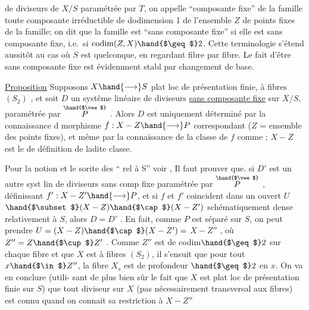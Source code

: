 
de diviseurs de $X/S$ paramétrée par $T$, on appelle ``composante fixe'' de la
famille toute composante irréductible de dodimension 1 de l'ensemble $Z$ de
points fixes de la famille; on dit que la famille est ``sans composante
fixe'' si elle est sans composante fixe, i.e.\ si $\operatorname{codim}(Z,X) \hand{$\geq$} 2$. Cette
terminologie s'étend aussitôt au cas où $S$ est quelconque, en regardant
fibre par fibre. Le fait d'être sans composante fixe est évidemment stabl
par changement de base.

\uline{Proposition} \hand{/}Supposons $X \hand{\longrightarrow} S$ plat loc de présentation finie, à fibres
$(S_2)$ , et soit $D$ un systême linéaire de diviseurs \uline{sans composante fixe}
sur $X/S$, paramétrée par $\overset{\hand{$\vee$}}{P}$ . Alors $D$ est uniquement déterminé par la
connaissance d morphisme $f: X - Z \hand{\longrightarrow} P$ correspondant ($Z$ = ensemble
des points fixes), et même par la connaissance de la classe de $f$ comme
  ; $X-Z$ est le 
de définition de ladite classe.

Pour la notion et le sorite des ``
rel à S'' voir  ,  Il faut prouver que.
si  $D'$ est un
autre syst lin de diviseurs sans comp fixe paramétrée par $\overset{\hand{$\vee$}}{P}$ , 
définissant $f': X-Z' \hand{\longrightarrow} P$, et si $f$ et $f'$ coincident dans un ouvert $U$
$\hand{$\subset$} (X-Z)\hand{$\cap$}(X-Z')$ schématiquement dense relativement à $S$, alors $D=D'$ .
En fait, comme $P$ est séparé sur $S$, on peut prendre $U=(X-Z)\hand{$\cap$}(X-Z') =$
 $X-Z''$ , où $Z'' = Z\hand{$\cup$}Z'$ . Comme $Z''$ est de codim$\hand{$\geq$}2$
sur chaque fibre et que $X$ est à fibres $(S_2)$, il s'ensuit que pour tout
$x\hand{$\in$} Z''$, la fibre $X_s$ est de profondeur $\hand{$\geq$}2$ en $x$. On va en conclure (utili-%
sant de plus bien sûr le fait que $X$ est plat loc de présentation finie
sur $S$) que tout diviseur  sur $X$ (pas nécessairement 
transversal aux fibres) est connu quand on connait sa restriction à $X-Z''$

